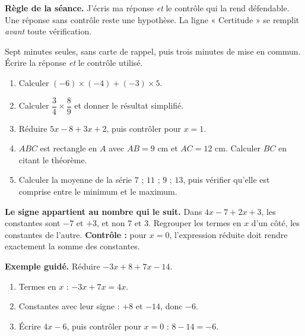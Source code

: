\documentclass[10pt,a4paper]{article}
\begin{document}
\begin{graybox}\small\textbf{Règle de la séance.} J'écris ma réponse \emph{et} le contrôle qui la rend défendable. Une réponse sans contrôle reste une hypothèse. La ligne « Certitude » se remplit \emph{avant} toute vérification.\end{graybox}
\par\vspace{2mm}
Sept minutes seules, sans carte de rappel, puis trois minutes de mise en commun. Écrire la réponse \emph{et} le contrôle utilisé.
\begin{enumerate}
\item Calculer $(-6)\times(-4) + (-3)\times 5$.
\item Calculer $\dfrac{3}{4}\times\dfrac{8}{9}$ et donner le résultat simplifié.
\item Réduire $5x - 8 + 3x + 2$, puis contrôler pour $x = 1$.
\item $ABC$ est rectangle en $A$ avec $AB = 9$ cm et $AC = 12$ cm. Calculer $BC$ en citant le théorème.
\item Calculer la moyenne de la série $7$ ; $11$ ; $9$ ; $13$, puis vérifier qu'elle est comprise entre le minimum et le maximum.
\end{enumerate}
\certline
\aideline
\needspace{62mm}\par\vspace{3mm}
\begin{methodbox}
\textbf{Le signe appartient au nombre qui le suit.} Dans $4x - 7 + 2x + 3$, les constantes sont $-7$ et $+3$,
et non $7$ et $3$. Regrouper les termes en $x$ d'un côté, les constantes de l'autre.
\textbf{Contrôle :} pour $x = 0$, l'expression réduite doit rendre exactement la somme des constantes.
\end{methodbox}
\begin{graybox}
\textbf{Exemple guidé.} Réduire $-3x + 8 + 7x - 14$.
\begin{enumerate}
\item Termes en $x$ : $-3x + 7x = 4x$.
\item Constantes avec leur signe : $+8$ et $-14$, donc $-6$.
\item Écrire $4x - 6$, puis contrôler pour $x = 0$ : $8 - 14 = -6$.
\end{enumerate}
\end{graybox}
\end{document}
